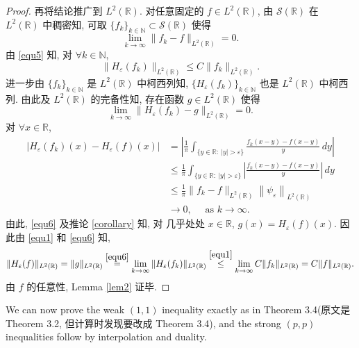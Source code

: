 \documentclass[a4paper,11pt]{article}
\theoremstyle{definition}
\begin{document}
\begin{CJK*}{UTF8}{gbsn}
\begin{proof}
    再将结论推广到 $ L^2(\mathbb{R}) $.
    对任意固定的 $ f \in L^2(\mathbb{R}) $, 由 $ \mathcal{S}(\mathbb{R}) $ 在 $ L^2(\mathbb{R}) $ 中稠密知, 
    可取 $ \{f_k\}_{k \in \mathbb{N}} \subset \mathcal{S}(\mathbb{R}) $ 使得
    $$
        \lim_{k \to \infty} \| f_k - f \|_{L^2(\mathbb{R})} = 0.
    $$
    由 \eqref{equ5} 知, 对 $ \forall k \in \mathbb{N} $,
    \begin{equation} \label{equ1}
        \| H_\varepsilon (f_k) \|_{L^2(\mathbb{R})} \leq C \| f_k \|_{L^2(\mathbb{R})}.
    \end{equation}
    进一步由 $ \{f_k\}_{k \in \mathbb{N}} $ 是 $ L^2(\mathbb{R}) $ 中柯西列知, 
    $ \{H_\varepsilon (f_k)\}_{k \in \mathbb{N}} $ 也是 $ L^2(\mathbb{R}) $ 中柯西列.
    由此及 $ L^2(\mathbb{R}) $ 的完备性知, 存在函数 $ g \in L^2(\mathbb{R}) $ 使得
    \begin{equation} \label{equ6}
        \lim_{k \to \infty} \| H_\varepsilon (f_k) - g \|_{L^2(\mathbb{R})} = 0.
    \end{equation}
    对 $ \forall x \in \mathbb{R} $,
    \begin{align*}
        |H_\varepsilon (f_k) (x) - H_\varepsilon (f) (x)|
            &= \left| \frac{1}{\pi} \int_{\{y \in \mathbb{R}:\ |y| > \varepsilon\}} 
                \frac{f_k(x - y) - f(x - y)}{y} \, dy \right| \\
            &\leq \frac{1}{\pi} \int_{\{y \in \mathbb{R}:\ |y| > \varepsilon\}} 
                \left| \frac{f_k(x - y) - f(x - y)}{y} \right| \, dy \\
            &\leq \frac{1}{\pi} \| f_k - f \|_{L^2(\mathbb{R})} 
                \left\| \psi_\varepsilon \right\|_{L^2(\mathbb{R})} \\
            &\to  0,  \quad \text{ as } k \to \infty.
    \end{align*}
    由此, \eqref{equ6} 及推论 \ref{corollary} 知, 对 几乎处处 $ x \in \mathbb{R} $, $ g(x) = H_\varepsilon (f) (x) $.
    因此由 \eqref{equ1} 和 \eqref{equ6} 知, 
    $$
        \| H_\varepsilon (f) \|_{L^2(\mathbb{R})} 
            = \| g \|_{L^2(\mathbb{R})} 
            \overset{\eqref{equ6}}{=} \lim_{k \to \infty} \| H_\varepsilon (f_k) \|_{L^2(\mathbb{R})} 
            \overset{\eqref{equ1}}{\leq} \lim_{k \to \infty} C \| f_k \|_{L^2(\mathbb{R})} 
            = C \| f \|_{L^2(\mathbb{R})}.
    $$
    由 $ f $ 的任意性, Lemma \ref{lem2} 证毕.
\end{proof}

\begin{framed}
    We can now prove the weak $ (1,1) $ inequality exactly as in
    Theorem 3.4(原文是 Theorem 3.2, 但计算时发现要改成 Theorem 3.4), 
    and the strong $ (p, p) $ inequalities follow by interpolation and duality.
\end{framed}



\end{CJK*}
\end{document}
